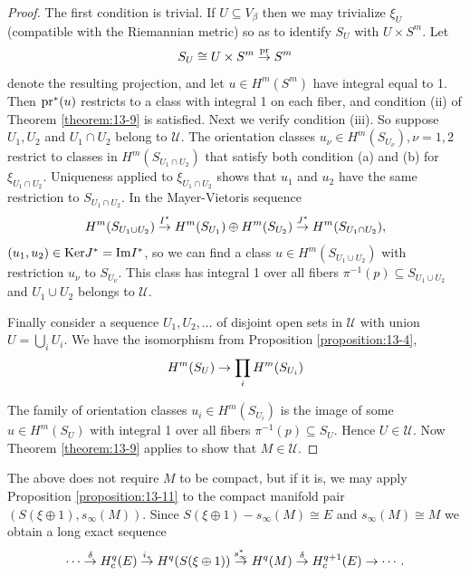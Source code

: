 \begin{proof}
  The first condition is trivial. If $U \subseteq  {V}_{\beta }$ then we may trivialize ${\xi }_{U}$ (compatible with the 
  Riemannian metric) so as to identify ${S}_{U}$ with $U \times  {S}^{m}$. Let
  \[
    {S}_{U} \cong  U \times  {S}^{m}\overset{\mathrm{pr}}{ \rightarrow  }{S}^{m}
  \]
  denote the resulting projection, and let $u \in  H^m( {S}^{m})$ have integral equal to 1. 
  Then ${\mathrm{pr}}^*( u)$ restricts to a class with integral 1 on each fiber, and condition (ii) of Theorem \ref{theorem:13-9} 
  is satisfied. Next we verify condition (iii). So suppose ${U}_{1},{U}_{2}$ and ${U}_{1} \cap  {U}_{2}$ belong 
  to $\mathcal{U}$. The orientation classes ${u}_{\nu } \in  H^m( {S}_{{U}_{\nu }}),\nu  = 1,2$ restrict to 
  classes in $H^m( {S}_{{U}_{1} \cap  {U}_{2}})$ that satisfy both condition (a) and (b) 
  for ${\xi }_{{U}_{1} \cap  {U}_{2}}$. Uniqueness applied to ${\xi }_{{U}_{1} \cap  {U}_{2}}$ shows 
  that ${u}_{1}$ and ${u}_{2}$ have the same restriction to ${S}_{{U}_{1} \cap  {U}_{2}}$. In the 
  Mayer-Vietoris sequence
  \[
    H^m( {S}_{{U}_{1} \cup  {U}_{2}}) 
    \overset{{I}^*}{ \rightarrow  }H^m( {S}_{{U}_{1}}) \oplus H^m( {S}_{{U}_{2}}) 
    \overset{{J}^*}{ \rightarrow  }H^m( {S}_{{U}_{1} \cap {U}_{2}}),
  \]
  $( {{u}_{1},{u}_{2}}) \in \mathrm{Ker}{J}^* = \mathrm{Im}{I}^*$, so we can find a class $u \in  H^m( {S}_{{U}_{1} \cup  {U}_{2}})$ 
  with restriction ${u}_{\nu }$ to ${S}_{{U}_{\nu }}$. This class has integral 1 over all fibers ${\pi }^{-1}( p) \subseteq{S}_{{U}_{1} \cup  {U}_{2}}$ 
  and ${U}_{1} \cup  {U}_{2}$ belongs to $\mathcal{U}$.
  
  Finally consider a sequence ${U}_{1},{U}_{2},\ldots$ of disjoint open sets in $\mathcal{U}$ with 
  union $U = \mathop{\bigcup }_{i}{U}_{i}$. We have the isomorphism from Proposition \ref{proposition:13-4},
  \[
    H^m( {S}_{U})  \rightarrow  \prod_{i}H^m( {S}_{{U}_{i}})
  \]
  
  The family of orientation classes ${u}_{i} \in  H^m( {S}_{{U}_{i}})$ is the image of some $u \in  H^m( {S}_{U})$ 
  with integral 1 over all fibers ${\pi }^{-1}( p)  \subseteq  {S}_{U}$. Hence $U \in  \mathcal{U}$. Now 
  Theorem \ref{theorem:13-9} applies to show that $M \in  \mathcal{U}$.
\end{proof}


The above does not require $M$ to be compact, but if it is, we may apply Proposition \ref{proposition:13-11} 
to the compact manifold pair $( {S( {\xi  \oplus  1}),{s}_{\infty }( M) })$. Since $S( {\xi  \oplus  1}) - {s}_{\infty }( M)  \cong  E$ 
and ${s}_{\infty }( M)  \cong  M$ we obtain a long exact sequence
\[
  \cdots \overset{\delta }{ \rightarrow  }H_c^{q}( E) 
  \overset{{i}_{ * }}{ \rightarrow  }{H}^{q}( {S( {\xi  \oplus  1}) }) 
  \overset{{s}_{\infty }^*}{ \rightarrow  }{H}^{q}( M) 
  \overset{\delta }{ \rightarrow  }H_c^{q + 1}( E)  
  \rightarrow \cdots.
\]

